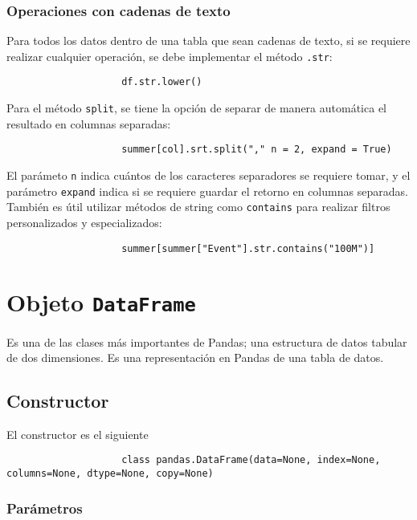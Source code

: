             \subsubsection{Operaciones con cadenas de texto}
                Para todos los datos dentro de una tabla que sean cadenas de texto, si se requiere realizar cualquier operación, se debe implementar el método \texttt{.str}:
                \begin{verbatim}
                    df.str.lower()
                \end{verbatim}
                Para el método \texttt{split}, se tiene la opción de separar de manera automática el resultado en columnas separadas:
                \begin{verbatim}
                    summer[col].srt.split("," n = 2, expand = True)
                \end{verbatim}
                El parámeto \texttt{n} indica cuántos de los caracteres separadores se requiere tomar, y el parámetro \texttt{expand} indica si se requiere guardar el retorno en columnas separadas. \\
                También es útil utilizar métodos de string como \texttt{contains} para realizar filtros personalizados y especializados:
                \begin{verbatim}
                    summer[summer["Event"].str.contains("100M")]
                \end{verbatim}



    \section{Objeto \texttt{DataFrame}}

        Es una de las clases más importantes de Pandas; una estructura de datos tabular de dos dimensiones. Es una representación en Pandas de una tabla de datos.

        \subsection{Constructor} El constructor es el siguiente

        \begin{verbatim}
                    class pandas.DataFrame(data=None, index=None, columns=None, dtype=None, copy=None)
                    \end{verbatim}
        \subsubsection{Parámetros}

